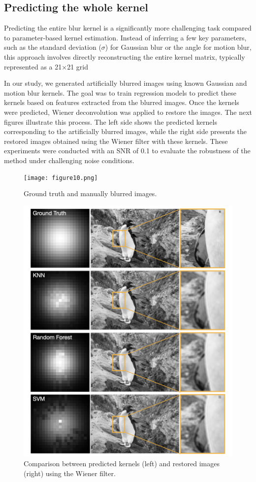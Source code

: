 \documentclass[twoside,11pt]{article}
\begin{document}
\subsection{Predicting the whole kernel}
Predicting the entire blur kernel is a significantly more challenging task compared to parameter-based kernel estimation. Instead of inferring a few key parameters, such as the standard deviation (\( \sigma \)) for Gaussian blur or the angle for motion blur, this approach involves directly reconstructing the entire kernel matrix, typically represented as a 21×21 grid

In our study, we generated artificially blurred images using known Gaussian and motion blur kernels. The goal was to train regression models to predict these kernels based on features extracted from the blurred images. Once the kernels were predicted, Wiener deconvolution was applied to restore the images.
The next figures illustrate this process. The left side shows the predicted kernels corresponding to the artificially blurred images, while the right side presents the restored images obtained using the Wiener filter with these kernels. These experiments were conducted with an SNR of 0.1 to evaluate the robustness of the method under challenging noise conditions.
\begin{figure}[H]
\centering
\texttt{[image: figure10.png]}
\caption{Ground truth and manually blurred images.}
\end{figure}

\begin{figure}[H]
\centering
\includegraphics[width=1\textwidth]{figure9.png}
\caption{Comparison between predicted kernels (left) and restored images (right) using the Wiener filter.}
\label{fig:predicted_vs_restored}
\end{figure}
\end{document}
